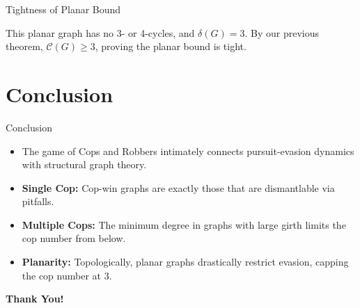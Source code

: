 \documentclass[10pt, aspectratio=169]{beamer}
\begin{document}
\begin{frame}{Tightness of Planar Bound}
    \begin{center}
    \end{center}
    This planar graph has no 3- or 4-cycles, and $\delta(G)=3$. By our previous theorem, $\mathcal{C}(G) \ge 3$, proving the planar bound is tight.
\end{frame}

\section{Conclusion}

\begin{frame}{Conclusion}
    \begin{itemize}
        \item The game of Cops and Robbers intimately connects pursuit-evasion dynamics with structural graph theory.
        \item \textbf{Single Cop:} Cop-win graphs are exactly those that are dismantlable via pitfalls.
        \item \textbf{Multiple Cops:} The minimum degree in graphs with large girth limits the cop number from below.
        \item \textbf{Planarity:} Topologically, planar graphs drastically restrict evasion, capping the cop number at 3.
    \end{itemize}
    \vspace{1cm}
    \begin{center}
        \Large \textbf{Thank You!}
    \end{center}
\end{frame}
\end{document}

